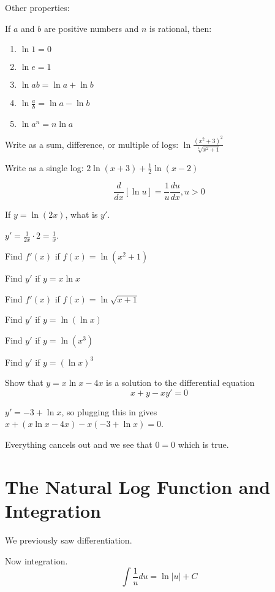 \documentclass[../bccalc.tex]{subfiles}
\begin{document}
Other properties:

    If $a$ and $b$ are positive numbers and $n$ is rational, then:
\begin{enumerate}
    \item $\ln 1 = 0$
    \item $\ln e = 1$
    \item $\ln ab = \ln a + \ln b$
    \item $\ln \frac{a}{b}=\ln a - \ln b$
    \item $\ln a^n = n\ln a$
\end{enumerate}

\ex Write as a sum, difference, or multiple of logs: $\ln \frac{(x^2+3)^2}{\sqrt[3]{x^2+1}}$

\ex Write as a single log: $2\ln (x+3)+\frac{1}{2}\ln (x-2)$

\begin{definition}
    \[ \frac{d}{dx}[\ln u]=\frac{1}{u}\frac{du}{dx}, u>0 \]
\end{definition}

\begin{example}
    If $y=\ln (2x)$, what is $y'$.

    $y'=\frac{1}{2x}\cdot 2 = \frac{1}{x}$.
\end{example}

\ex Find $f'(x)$ if $f(x)=\ln(x^2+1)$

\ex Find $y'$ if $y=x\ln x$

\ex Find $f'(x)$ if $f(x)=\ln\sqrt{x+1}$

\ex Find $y'$ if $y=\ln(\ln x)$

\ex Find $y'$ if $y=\ln(x^3)$

\ex Find $y'$ if $y=(\ln x)^3$

\begin{example}
    Show that $y=x\ln x-4x$ is a solution to the differential equation 
    \[ x+y-xy'=0 \]

    $y'=-3+\ln x$, so plugging this in gives $x+(x\ln x-4x)-x(-3+\ln x)=0$.

    Everything cancels out and we see that $0=0$ which is true.
\end{example}

\section{The Natural Log Function and Integration}
We previously saw differentiation.

Now integration.
\[ \int \frac{1}{u}du = \ln|u|+C \]
\end{document}
